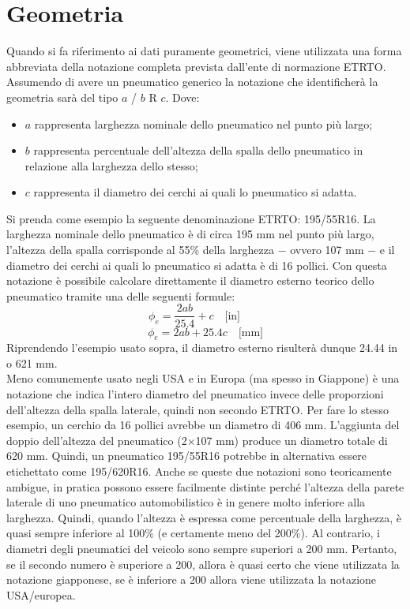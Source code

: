 \section{Geometria}
Quando si fa riferimento ai dati puramente geometrici, viene utilizzata una forma abbreviata della notazione completa prevista dall'ente di normazione \ac{ETRTO}. Assumendo di avere un pneumatico generico la notazione che identificherà la geometria sarà del tipo $a$ / $b$ R $c$. Dove:
\begin{itemize}
	\item $a$ rappresenta larghezza nominale dello pneumatico nel punto più largo;
	\item $b$ rappresenta percentuale dell'altezza della spalla dello pneumatico in relazione alla larghezza dello stesso;
	\item $c$ rappresenta il diametro dei cerchi ai quali lo pneumatico si adatta.
\end{itemize}
Si prenda come esempio la seguente denominazione \ac{ETRTO}: 195/55R16. La larghezza nominale dello pneumatico è di circa 195 mm nel punto più largo, l'altezza della spalla corrisponde al 55\% della larghezza $-$ ovvero 107 mm $-$ e il diametro dei cerchi ai quali lo pneumatico si adatta è di 16 pollici. Con questa notazione è possibile calcolare direttamente il diametro esterno teorico dello pneumatico tramite una delle seguenti formule:
%
\begin{equation}
\phi_e = \frac{2ab}{25.4}+c \quad \text{[in]} \qquad
\end{equation}
\begin{equation}
\phi_e = 2ab+25.4c \quad \text{[mm]}
\end{equation}
%
Riprendendo l'esempio usato sopra, il diametro esterno risulterà dunque 24.44 in o 621 mm.\\
Meno comunemente usato negli USA e in Europa (ma spesso in Giappone) è una notazione che indica l'intero diametro del pneumatico invece delle proporzioni dell'altezza della spalla laterale, quindi non secondo \ac{ETRTO}. Per fare lo stesso esempio, un cerchio da 16 pollici avrebbe un diametro di 406 mm. L'aggiunta del doppio dell'altezza del pneumatico (2$\times$107 mm) produce un diametro totale di 620 mm. Quindi, un pneumatico 195/55R16 potrebbe in alternativa essere etichettato come 195/620R16. Anche se queste due notazioni sono teoricamente ambigue, in pratica possono essere facilmente distinte perché l'altezza della parete laterale di uno pneumatico automobilistico è in genere molto inferiore alla larghezza. Quindi, quando l'altezza è espressa come percentuale della larghezza, è quasi sempre inferiore al 100\% (e certamente meno del 200\%). Al contrario, i diametri degli pneumatici del veicolo sono sempre superiori a 200 mm. Pertanto, se il secondo numero è superiore a 200, allora è quasi certo che viene utilizzata la notazione giapponese, se è inferiore a 200 allora viene utilizzata la notazione USA/europea.

